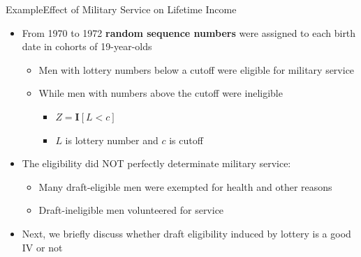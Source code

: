 \documentclass[dvipsnames,hyperref={pdfpagelabels=false}]{beamer}
\begin{document}
\begin{frame}{Example}{Effect of Military Service on Lifetime Income}
	\begin{itemize}
		\item From 1970 to 1972 \textbf{random sequence numbers} were assigned to each birth date in cohorts of 19-year-olds 
		\vspace{0.2cm} 
			\begin{itemize}
		\item Men with lottery numbers below a cutoff were eligible for military service 
				\vspace{0.2cm} 
		\item While men with numbers above the cutoff were ineligible
		\vspace{0.2cm} 
							\begin{itemize}		
		\item $Z=\mathbf{I}[L<c]$
				\vspace{0.2cm} 

				\item $L$ is lottery number and $c$ is cutoff	
								\vspace{0.2cm} 	
			\end{itemize} 
		\end{itemize} 	
		\item The eligibility did NOT perfectly determinate military service:
		\vspace{0.2cm}
		\begin{itemize} 
			\item Many draft-eligible men were exempted for health and other reasons
			\vspace{0.2cm}
			\item Draft-ineligible men volunteered for service
			\vspace{0.2cm}
			
		\end{itemize} 
		\item Next, we briefly discuss whether draft eligibility induced by lottery is a good IV or not
		
	\end{itemize}
\end{frame}
\end{document}
